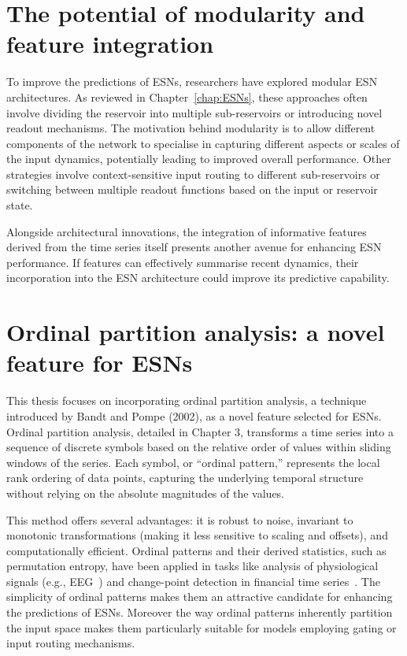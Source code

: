 \section{The potential of modularity and feature integration}
\label{sec:modularity_feature_integration}

To improve the predictions of ESNs, researchers have explored modular ESN architectures. As reviewed in Chapter~\ref{chap:ESNs}, these approaches often involve dividing the reservoir into multiple sub-reservoirs or introducing novel readout mechanisms. The motivation behind modularity is to allow different components of the network to specialise in capturing different aspects or scales of the input dynamics, potentially leading to improved overall performance. Other strategies involve context-sensitive input routing to different sub-reservoirs or switching between multiple readout functions based on the input or reservoir state.

Alongside architectural innovations, the integration of informative features derived from the time series itself presents another avenue for enhancing ESN performance. If features can effectively summarise recent dynamics, their incorporation into the ESN architecture could improve its predictive capability.

\section{Ordinal partition analysis: a novel feature for ESNs}
\label{sec:ordinal_partition_analysis}

This thesis focuses on incorporating ordinal partition analysis, a technique introduced by Bandt and Pompe (2002), as a novel feature selected for ESNs. Ordinal partition analysis, detailed in Chapter 3, transforms a time series into a sequence of discrete symbols based on the relative order of values within sliding windows of the series. Each symbol, or ``ordinal pattern,'' represents the local rank ordering of data points, capturing the underlying temporal structure without relying on the absolute magnitudes of the values.

This method offers several advantages: it is robust to noise, invariant to monotonic transformations (making it less sensitive to scaling and offsets), and computationally efficient. Ordinal patterns and their derived statistics, such as permutation entropy, have been applied in tasks like analysis of physiological signals (e.g., EEG~\cite{keller_2007}) and change-point detection in financial time series~\cite{zanin_2013}. The simplicity of ordinal patterns makes them an attractive candidate for enhancing the predictions of ESNs. Moreover the way ordinal patterns inherently partition the input space makes them particularly suitable for models employing gating or input routing mechanisms.


